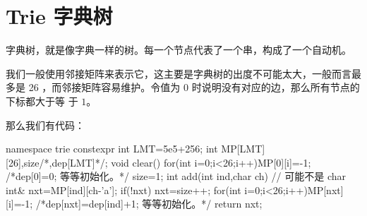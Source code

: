 \section{Trie 字典树} \label{sec:Trie 字典树}
字典树，就是像字典一样的树。每一个节点代表了一个串，构成了一个自动机。

我们一般使用邻接矩阵来表示它，这主要是字典树的出度不可能太大，一般而言最多是 26
，而邻接矩阵容易维护。令值为 $0$ 时说明没有对应的边，那么所有节点的下标都大于等
于 $1$。

那么我们有代码：
\begin{Cpp}
namespace trie{
    constexpr int LMT=5e5+256;
    int MP[LMT][26],size/*,dep[LMT]*/;
    void clear(){
        for(int i=0;i<26;i++)MP[0][i]=-1;
        /*dep[0]=0; 等等初始化。*/
        size=1;
    }
    int add(int ind,char ch){ // 可能不是 char
        int& nxt=MP[ind][ch-'a'];
        if(!nxt){
            nxt=size++;
            for(int i=0;i<26;i++)MP[nxt][i]=-1;
            /*dep[nxt]=dep[ind]+1; 等等初始化。*/
        }
        return nxt;
    }
}
\end{Cpp}
